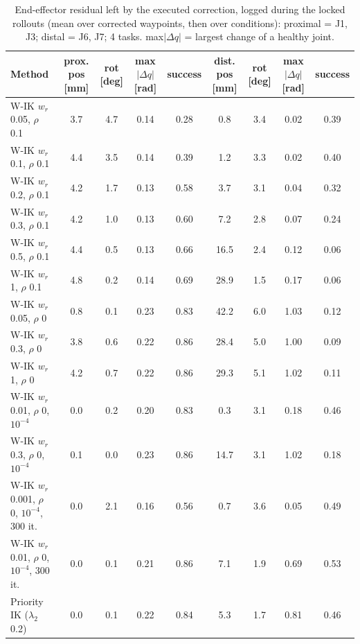 \begin{table}[t]
\centering
\caption{End-effector residual left by the executed correction, logged during the locked rollouts (mean over corrected waypoints, then over conditions): proximal = J1, J3; distal = J6, J7; 4 tasks. max$|\Delta q|$ = largest change of a healthy joint.}
\label{tab:residuals}
\setlength{\tabcolsep}{3pt}
\begin{tabular}{lcccccccc}
\toprule
Method & prox. pos [mm] & rot [deg] & max$|\Delta q|$ [rad] & success & dist. pos [mm] & rot [deg] & max$|\Delta q|$ [rad] & success \\
\midrule
W-IK $w_r$ 0.05, $\rho$ 0.1 & 3.7 & 4.7 & 0.14 & 0.28 & 0.8 & 3.4 & 0.02 & 0.39 \\
W-IK $w_r$ 0.1, $\rho$ 0.1 & 4.4 & 3.5 & 0.14 & 0.39 & 1.2 & 3.3 & 0.02 & 0.40 \\
W-IK $w_r$ 0.2, $\rho$ 0.1 & 4.2 & 1.7 & 0.13 & 0.58 & 3.7 & 3.1 & 0.04 & 0.32 \\
W-IK $w_r$ 0.3, $\rho$ 0.1 & 4.2 & 1.0 & 0.13 & 0.60 & 7.2 & 2.8 & 0.07 & 0.24 \\
W-IK $w_r$ 0.5, $\rho$ 0.1 & 4.4 & 0.5 & 0.13 & 0.66 & 16.5 & 2.4 & 0.12 & 0.06 \\
W-IK $w_r$ 1, $\rho$ 0.1 & 4.8 & 0.2 & 0.14 & 0.69 & 28.9 & 1.5 & 0.17 & 0.06 \\
W-IK $w_r$ 0.05, $\rho$ 0 & 0.8 & 0.1 & 0.23 & 0.83 & 42.2 & 6.0 & 1.03 & 0.12 \\
W-IK $w_r$ 0.3, $\rho$ 0 & 3.8 & 0.6 & 0.22 & 0.86 & 28.4 & 5.0 & 1.00 & 0.09 \\
W-IK $w_r$ 1, $\rho$ 0 & 4.2 & 0.7 & 0.22 & 0.86 & 29.3 & 5.1 & 1.02 & 0.11 \\
W-IK $w_r$ 0.01, $\rho$ 0, $10^{-4}$ & 0.0 & 0.2 & 0.20 & 0.83 & 0.3 & 3.1 & 0.18 & 0.46 \\
W-IK $w_r$ 0.3, $\rho$ 0, $10^{-4}$ & 0.1 & 0.0 & 0.23 & 0.86 & 14.7 & 3.1 & 1.02 & 0.18 \\
W-IK $w_r$ 0.001, $\rho$ 0, $10^{-4}$, 300 it. & 0.0 & 2.1 & 0.16 & 0.56 & 0.7 & 3.6 & 0.05 & 0.49 \\
W-IK $w_r$ 0.01, $\rho$ 0, $10^{-4}$, 300 it. & 0.0 & 0.1 & 0.21 & 0.86 & 7.1 & 1.9 & 0.69 & 0.53 \\
Priority IK ($\lambda_2$ 0.2) & 0.0 & 0.1 & 0.22 & 0.84 & 5.3 & 1.7 & 0.81 & 0.46 \\
\bottomrule
\end{tabular}
\end{table}
